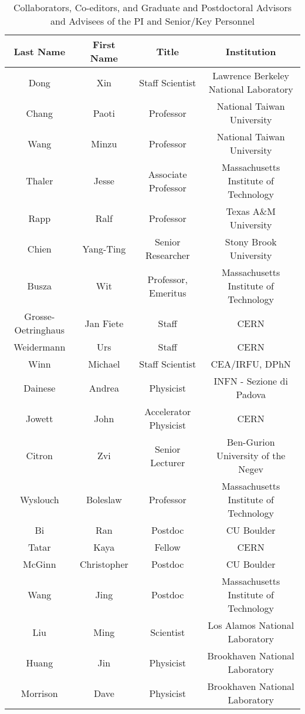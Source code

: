 \begin{table}[h]
\centering
 \caption{Collaborators, Co-editors, and Graduate and Postdoctoral Advisors and Advisees of the PI and Senior/Key Personnel}
  \begin{tabular}{ | c | c | c | c | }
    \hline
    \textbf{Last Name} &  \textbf{First Name} &  \textbf{Title} & \textbf{Institution} \\ \hline
    Dong & Xin & Staff Scientist &  Lawrence Berkeley National Laboratory\\ \hline
    Chang & Paoti & Professor &  National Taiwan University\\ \hline
    Wang & Minzu & Professor &  National Taiwan University\\ \hline
    Thaler & Jesse & Associate Professor &  Massachusetts Institute of Technology\\ \hline
    Rapp & Ralf & Professor &  Texas A\&M University\\ \hline
    Chien & Yang-Ting & Senior Researcher & Stony Brook University \\ \hline
    Busza & Wit & Professor, Emeritus & Massachusetts Institute of Technology \\ \hline
    Grosse-Oetringhaus & Jan Fiete & Staff & CERN \\ \hline
    Weidermann & Urs & Staff & CERN \\ \hline
    Winn & Michael & Staff Scientist & CEA/IRFU, DPhN \\ \hline
    Dainese & Andrea & Physicist & INFN - Sezione di Padova \\ \hline
    Jowett & John & Accelerator Physicist & CERN \\ \hline
    Citron & Zvi & Senior Lecturer & Ben-Gurion University of the Negev \\ \hline
    Wyslouch & Boleslaw & Professor & Massachusetts Institute of Technology \\ \hline
    Bi & Ran & Postdoc & CU Boulder \\ \hline
    Tatar & Kaya & Fellow & CERN \\ \hline
    McGinn & Christopher & Postdoc & CU Boulder \\ \hline
    Wang & Jing & Postdoc & Massachusetts Institute of Technology \\ \hline
    Liu & Ming & Scientist & Los Alamos National Laboratory \\ \hline
    Huang & Jin & Physicist & Brookhaven National Laboratory \\ \hline
    Morrison & Dave & Physicist & Brookhaven National Laboratory \\ \hline

\end{tabular}
\end{table}
